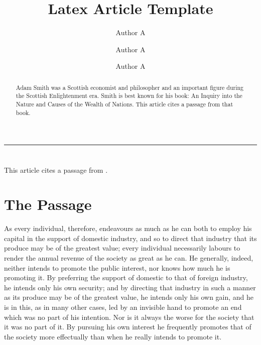 \documentclass[10 pt,a4paper]{article}
\title{\LARGE Latex Article Template}
\date{}
\author[1]{Author A}
\author[2]{Author A}
\author[3]{Author A}
\affil[1]{\it\small Department of Economics, University 1, ...}
\affil[2]{\it\small Department of Statistics, University 2, ...}
\affil[3]{\it\small Department of Mathematics, University 3, ...}
\begin{document}
\maketitle
\thispagestyle{empty}

\begin{abstract}
Adam Smith was a Scottish economist and philosopher and an important figure during the Scottish Enlightenment era. Smith is best known for his book: An Inquiry into the Nature and Causes of the Wealth of Nations. This article cites a passage from that book.
\end{abstract}
\par\noindent\rule{\textwidth}{0.4pt} %
\vspace*{-1.7cm} %

\section*{} %

This article cites a passage from \citet{smith1827inquiry}.
 
\section{The Passage}

As every individual, therefore, endeavours as much as he can both to employ his capital in the support of domestic industry, and so to direct that industry that its produce may be of the greatest value; every individual necessarily labours to render the annual revenue of the society as great as he can. He generally, indeed, neither intends to promote the public interest, nor knows how much he is promoting it. By preferring the support of domestic to that of foreign industry, he intends only his own security; and by directing that industry in such a manner as its produce may be of the greatest value, he intends only his own gain, and he is in this, as in many other cases, led by an invisible hand to promote an end which was no part of his intention. Nor is it always the worse for the society that it was no part of it. By pursuing his own interest he frequently promotes that of the society more effectually than when he really intends to promote it.



\end{document}
